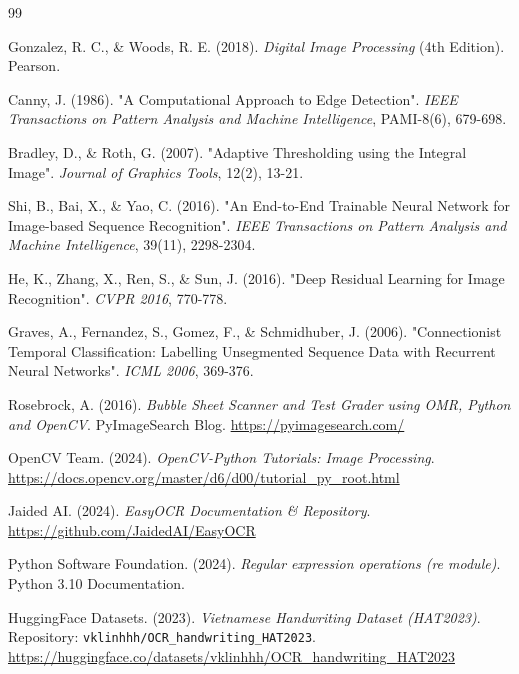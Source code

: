 \documentclass[6pt, a4paper]{report}
\begin{document}
	\begin{thebibliography}{99}
		
		Gonzalez, R. C., \& Woods, R. E. (2018). \textit{Digital Image Processing} (4th Edition). Pearson.
		
		Canny, J. (1986). "A Computational Approach to Edge Detection". \textit{IEEE Transactions on Pattern Analysis and Machine Intelligence}, PAMI-8(6), 679-698.
		
		Bradley, D., \& Roth, G. (2007). "Adaptive Thresholding using the Integral Image". \textit{Journal of Graphics Tools}, 12(2), 13-21.
		
		Shi, B., Bai, X., \& Yao, C. (2016). "An End-to-End Trainable Neural Network for Image-based Sequence Recognition". \textit{IEEE Transactions on Pattern Analysis and Machine Intelligence}, 39(11), 2298-2304.
		
		He, K., Zhang, X., Ren, S., \& Sun, J. (2016). "Deep Residual Learning for Image Recognition". \textit{CVPR 2016}, 770-778.
		
		Graves, A., Fernandez, S., Gomez, F., \& Schmidhuber, J. (2006). "Connectionist Temporal Classification: Labelling Unsegmented Sequence Data with Recurrent Neural Networks". \textit{ICML 2006}, 369-376.
		
		Rosebrock, A. (2016). \textit{Bubble Sheet Scanner and Test Grader using OMR, Python and OpenCV}. PyImageSearch Blog. \url{https://pyimagesearch.com/}
		
		OpenCV Team. (2024). \textit{OpenCV-Python Tutorials: Image Processing}. \url{https://docs.opencv.org/master/d6/d00/tutorial_py_root.html}
		
		Jaided AI. (2024). \textit{EasyOCR Documentation \& Repository}. \url{https://github.com/JaidedAI/EasyOCR}
		
		Python Software Foundation. (2024). \textit{Regular expression operations (re module)}. Python 3.10 Documentation.
		
		HuggingFace Datasets. (2023). \textit{Vietnamese Handwriting Dataset (HAT2023)}. Repository: \texttt{vklinhhh/OCR\_handwriting\_HAT2023}. \url{https://huggingface.co/datasets/vklinhhh/OCR_handwriting_HAT2023}
		
	\end{thebibliography}
	
\end{document}
